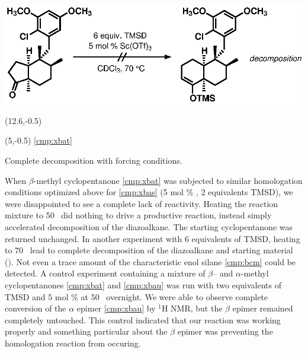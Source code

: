 \begin{Scheme}[t]
  \centering
  \includegraphics[scale=0.8]{chp_singlecarbon/images/homoonebeta}
   \begin{textblock}{1}(12.6,-0.5)  \end{textblock}
    \begin{textblock}{1}(5,-0.5) \textsf{\scriptsize{\ref{cmp:xbat}}}
\end{textblock}
  \caption{Complete decomposition with forcing conditions.}
  \label{sch:homoonebeta}
\end{Scheme}
When $\beta$-methyl cyclopentanone \ref{cmp:xbat} was subjected to similar homologation
conditions optimized above for \ref{cmp:xbas} (5 mol \% , 2 equivalents TMSD), we were
disappointed to see a complete lack of reactivity. Heating the reaction mixture to 50 \degc\ did nothing to drive a productive reaction,
instead simply accelerated decomposition of the diazoalkane. The starting cyclopentanone was
returned unchanged. In another experiment with 6 equivalents of TMSD, heating to 70 \degc\ lead to
complete decomposition of the diazoalkane and starting material (). Not even
a trace amount of the characteristic enol silane \ref{cmp:bcm} could be detected. A control
experiment containing a mixture of $\beta$-- and $\alpha$-methyl cyclopentanones \ref{cmp:xbat} and \ref{cmp:xbau} was run with two equivalents of TMSD and 5 mol \%  at 50 \degc\ 
overnight. We were able to observe complete conversion of the $\alpha$ epimer \ref{cmp:xbau} by
$^1$H NMR, but the $\beta$ epimer remained completely untouched. This control indicated that our
reaction was working properly and something particular about the $\beta$ epimer was preventing the
homologation reaction from occuring. 

